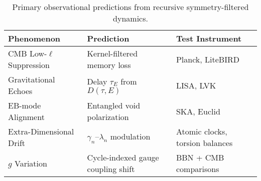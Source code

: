 \begin{table}[H]
\centering
\begin{tabular}{|l|l|l|}
\hline
\textbf{Phenomenon} & \textbf{Prediction} & \textbf{Test Instrument} \\
\hline
CMB Low-$\ell$ Suppression & Kernel-filtered memory loss & Planck, LiteBIRD \\
Gravitational Echoes & Delay $\tau_E$ from $D(\tau, E)$ & LISA, LVK \\
EB-mode Alignment & Entangled void polarization & SKA, Euclid \\
Extra-Dimensional Drift & $\gamma_n$–$\lambda_n$ modulation & Atomic clocks, torsion balances \\
$g$ Variation & Cycle-indexed gauge coupling shift & BBN + CMB comparisons \\
\hline
\end{tabular}
\caption{Primary observational predictions from recursive symmetry-filtered dynamics.}
\end{table}
